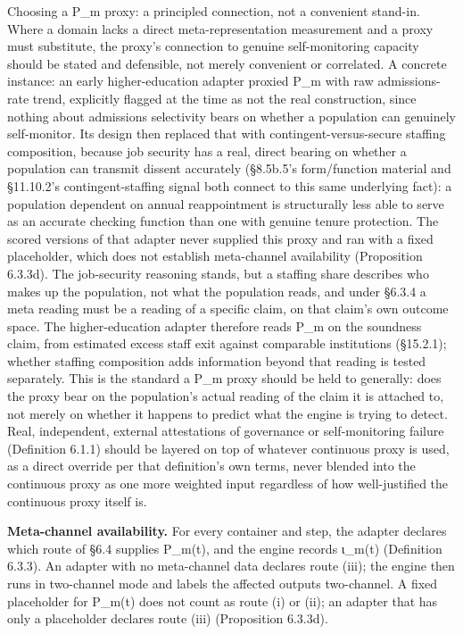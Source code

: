 \documentclass[
]{article}
\begin{document}
Choosing a P\_m proxy: a principled connection, not a convenient
stand-in. Where a domain lacks a direct meta-representation measurement
and a proxy must substitute, the proxy's connection to genuine
self-monitoring capacity should be stated and defensible, not merely
convenient or correlated. A concrete instance: an early higher-education
adapter proxied P\_m with raw admissions-rate trend, explicitly flagged
at the time as not the real construction, since nothing about admissions
selectivity bears on whether a population can genuinely self-monitor.
Its design then replaced that with contingent-versus-secure staffing
composition, because job security has a real, direct bearing on whether
a population can transmit dissent accurately (§8.5b.5's form/function
material and §11.10.2's contingent-staffing signal both connect to this
same underlying fact): a population dependent on annual reappointment is
structurally less able to serve as an accurate checking function than
one with genuine tenure protection. The scored versions of that adapter
never supplied this proxy and ran with a fixed placeholder, which does
not establish meta-channel availability (Proposition 6.3.3d). The
job-security reasoning stands, but a staffing share describes who makes
up the population, not what the population reads, and under §6.3.4 a
meta reading must be a reading of a specific claim, on that claim's own
outcome space. The higher-education adapter therefore reads P\_m on the
soundness claim, from estimated excess staff exit against comparable
institutions (§15.2.1); whether staffing composition adds information
beyond that reading is tested separately. This is the standard a P\_m
proxy should be held to generally: does the proxy bear on the
population's actual reading of the claim it is attached to, not merely
on whether it happens to predict what the engine is trying to detect.
Real, independent, external attestations of governance or
self-monitoring failure (Definition 6.1.1) should be layered on top of
whatever continuous proxy is used, as a direct override per that
definition's own terms, never blended into the continuous proxy as one
more weighted input regardless of how well-justified the continuous
proxy itself is.

\textbf{Meta-channel availability.} For every container and step, the
adapter declares which route of §6.4 supplies P\_m(t), and the engine
records ι\_m(t) (Definition 6.3.3). An adapter with no meta-channel data
declares route (iii); the engine then runs in two-channel mode and
labels the affected outputs two-channel. A fixed placeholder for P\_m(t)
does not count as route (i) or (ii); an adapter that has only a
placeholder declares route (iii) (Proposition 6.3.3d).
\end{document}
